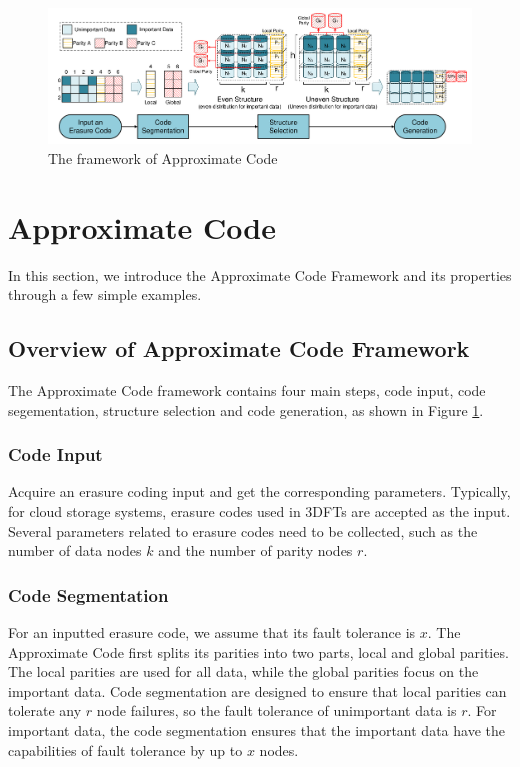\documentclass[sigconf]{acmart}
\begin{document}
\begin{figure}[ht!]
\centering
\includegraphics[width=0.8\linewidth]{photo/Framework-v3.pdf}
\caption{The framework of Approximate Code}
\label{fig-framework}
\end{figure}

\section{Approximate Code}\label{ApCode}
In this section, we introduce the Approximate Code Framework and its properties through a few simple examples.

\subsection{Overview of Approximate Code Framework}
The Approximate Code framework contains four main steps, code input, code segementation, structure selection and code generation, as shown in Figure \ref{fig-framework}.

\subsubsection{Code Input}
Acquire an erasure coding input and get the corresponding parameters. Typically, for cloud storage systems, erasure codes used in 3DFTs are accepted as the input. Several parameters related to erasure codes need to be collected, such as the number of data nodes $k$ and the number of parity nodes $r$.

\subsubsection{Code Segmentation}
For an inputted erasure code, we assume that its fault tolerance is $x$. The Approximate Code first splits its parities into two parts, local and global parities. The local parities are used for all data, while the global parities focus on the important data. Code segmentation are designed to ensure that local parities can tolerate any $r$ node failures, so the fault tolerance of unimportant data is $r$. For important data, the code segmentation ensures that the important data have the capabilities of fault tolerance by up to $x$ nodes.
\end{document}
